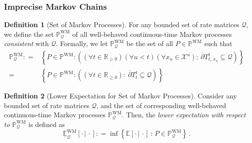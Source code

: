 \documentclass[10pt]{paper}
\theoremstyle{definition}
\newtheorem{definition}{Definition}
\newcommand{\reals}{\mathbb{R}}
\newcommand{\realspos}{\reals_{>0}}
\newcommand{\realsnonneg}{\reals_{\geq 0}}
\newcommand{\states}{\mathcal{X}}
\newcommand{\processes}{\mathbb{P}}
\newcommand{\mprocesses}{\processes^{\mathrm{M}}}
\newcommand{\wmprocesses}{\processes^{\mathrm{WM}}}
\newcommand{\gambles}{\mathcal{L}}
\newcommand{\gamblesX}{\gambles(\states)}
\newcommand{\rateset}{\mathcal{Q}}
\newcommand{\norm}[1]{\left\lVert #1 \right\rVert}
\newcommand{\coloneqq}{:\!=}
\begin{document}
\subsubsection{Imprecise Markov Chains}

\begin{definition}[Set of Markov Processes]\label{def:markov_process_set_new}
For any bounded set of rate matrices $\rateset$, we define the set $\wmprocesses_{\rateset}$ of all well-behaved continuous-time Markov processes \emph{consistent} with $\rateset$. Formally, we let $\wmprocesses_{\rateset}$ be the set of all $P\in\wmprocesses$ such that
\begin{align*}
\wmprocesses_\rateset
\coloneqq&
\left\{
P\in\wmprocesses
\colon
\left((\forall t\in\realsnonneg)(\forall u<t)(\forall x_u\in\states^u):~
\overline{\partial}
{T^t_{t,\,x_u}}\subseteq\rateset
\right)\right\}\\
=&
\left\{
P\in\wmprocesses
\colon
\left((\forall t\in\realsnonneg):~
\overline{\partial}
{T^t_{t}}\subseteq\rateset
\right)\right\}
\end{align*}
\end{definition}

\begin{definition}[Lower Expectation for Set of Markov Processes]\label{def:lower_markov} Consider any bounded set of rate matrices $\rateset$, and the set of corresponding well-behaved continuous-time Markov processes $\wmprocesses_\rateset$. Then, the \emph{lower expectation with respect to $\wmprocesses_\rateset$} is defined as
\begin{equation*}
\underline{\mathbb{E}}_\rateset^\mathrm{WM}[\cdot\,\vert\,\cdot] \coloneqq \inf\left\{\mathbb{E}[\cdot\,\vert\,\cdot]\,:\,P\in\wmprocesses_\rateset\right\}\,.
\end{equation*}
\end{definition}
\end{document}
